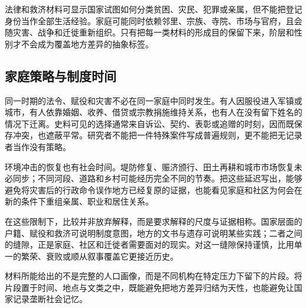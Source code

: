 法律和救济材料可显示国家试图如何分类贫困、灾民、犯罪或亲属，但不能把登记身份当作全部生活经验。家庭可能同时依赖邻里、宗族、寺院、市场与官府，且会随灾害、战争和迁徙重新组织。只有把每一类材料的形成目的保留下来，阶层和性别才不会成为覆盖地方差异的抽象标签。

\subsection{家庭策略与制度时间}

同一时期的法令、赋役和灾害不必在同一家庭中同时发生。有人因服役进入军镇或城市，有人依靠婚姻、收养、借贷或宗教捐施维持关系，也有人在没有留下姓名的情况下迁离。史料可见的选择通常来自诉讼、契约、表彰或追赠的时刻，因而既保存冲突，也遮蔽平常。研究者不能把一件特殊案件写成普遍规则，更不能把无记录者当作没有策略。

环境冲击的恢复也有社会时间。堤防修复、赈济颁行、田土再耕和城市市场恢复未必同步；不同河段、道路和乡村可能经历完全不同的节奏。把这些延迟写出，能够避免将灾害后的行政命令误作地方已经复原的证据，也能看见家庭和社区为何会在新的条件下重组亲属、职业和居住关系。

在这些限制下，比较并非放弃解释，而是要求解释的尺度与证据相称。国家层面的户籍、赋役和救济可说明制度意图，地方的文书与遗存可说明某些实践；二者之间的缝隙，正是家庭、社区和迁徙者需要面对的现实。对这一缝隙保持谨慎，比用单一的繁荣、衰败或顺从叙事覆盖它更接近历史。


材料所能给出的不是完整的人口画像，而是不同机构在特定压力下留下的片段。将片段置于时间、地点与文类之中，既能避免把地方差异归结为天性，也能避免让国家记录垄断社会记忆。


